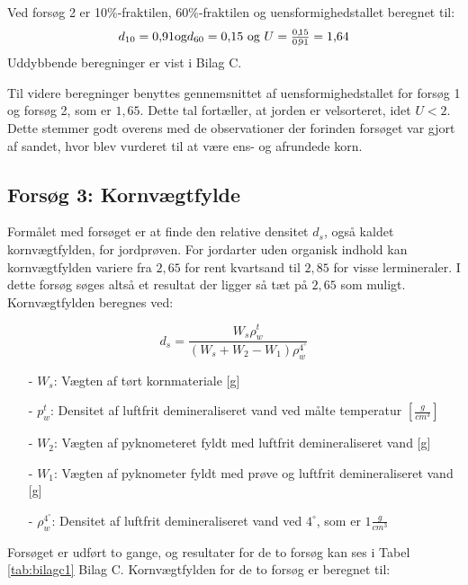Ved forsøg 2 er 10\%-fraktilen, 60\%-fraktilen og uensformighedstallet beregnet til:
\begin{equation}
	d_{10} = 0,\!91 \text{og} d_{60} = 0,\!15$ \text{og} $U = \frac{0,\!15}{0,\!91} = 1,\!64
\end{equation} 
Uddybbende beregninger er vist i Bilag C.

Til videre beregninger benyttes gennemsnittet af uensformighedstallet for forsøg 1 og forsøg 2, som er $1,\!65$. Dette tal fortæller, at jorden er velsorteret, idet $U<2$. Dette stemmer godt overens med de observationer der forinden forsøget var gjort af sandet, hvor blev vurderet til at være ens- og afrundede korn. 

\subsection{Forsøg 3: Kornvægtfylde}
Formålet med forsøget er at finde den relative densitet $d_s$, også kaldet kornvægtfylden, for jordprøven. For jordarter uden organisk indhold kan kornvægtfylden variere fra $2,\!65$ for rent kvartsand til $2,\!85$ for visse lermineraler. I dette forsøg søges altså et resultat der ligger så tæt på $2,\!65$ som muligt.
\newline
\newline
Kornvægtfylden beregnes ved:

\begin{equation}
	d_s = \frac{W_s \rho_w^t}{(W_s + W_2 - W_1)\rho_w^{4^{\circ}}}
\end{equation}

\begin{itemize}
	\item[-] $W_s$: Vægten af tørt kornmateriale [g]
	\item[-] $p_w^t$: Densitet af luftfrit demineraliseret vand ved målte temperatur $[\frac{g}{cm^3}]$
	\item[-] $W_2$: Vægten af pyknometeret fyldt med luftfrit demineraliseret vand [g]
	\item[-] $W_1$: Vægten af pyknometer fyldt med prøve og luftfrit demineraliseret vand [g]
	\item[-] $\rho_w^{4^{\circ}}$: Densitet af luftfrit demineraliseret vand ved $4^{\circ}$, som er $1 \frac{g}{cm^3}$
\end{itemize}

Forsøget er udført to gange, og resultater for de to forsøg kan ses i Tabel \ref{tab:bilagc1} Bilag C. Kornvægtfylden for de to forsøg er beregnet til:

